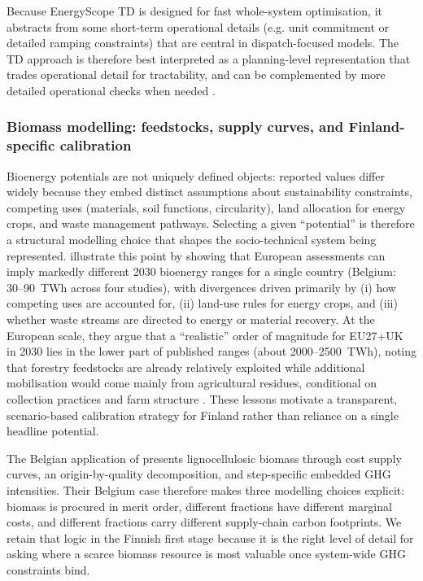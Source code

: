 \documentclass{article}
\begin{document}
Because EnergyScope TD is designed for fast whole-system optimisation, it abstracts from some short-term operational details (e.g. unit commitment or detailed ramping constraints) that are central in dispatch-focused models. The TD approach is therefore best interpreted as a planning-level representation that trades operational detail for tractability, and can be complemented by more detailed operational checks when needed \citep{thiranExploringOptionsFossilfree2025}.


\subsubsection{Biomass modelling: feedstocks, supply curves, and Finland-specific calibration}
\label{sec:biomass_modelling}

Bioenergy potentials are not uniquely defined objects: reported values differ widely because they embed distinct assumptions about sustainability constraints, competing uses (materials, soil functions, circularity), land allocation for energy crops, and waste management pathways. Selecting a given ``potential'' is therefore a structural modelling choice that shapes the socio-technical system being represented. \citet{collaNavigatingBioenergyHorizons2024} illustrate this point by showing that European assessments can imply markedly different 2030 bioenergy ranges for a single country (Belgium: 30--90~TWh across four studies), with divergences driven primarily by (i) how competing uses are accounted for, (ii) land-use rules for energy crops, and (iii) whether waste streams are directed to energy or material recovery. At the European scale, they argue that a ``realistic'' order of magnitude for EU27+UK in 2030 lies in the lower part of published ranges (about 2000--2500~TWh), noting that forestry feedstocks are already relatively exploited while additional mobilisation would come mainly from agricultural residues, conditional on collection practices and farm structure \citep{collaNavigatingBioenergyHorizons2024}. These lessons motivate a transparent, scenario-based calibration strategy for Finland rather than reliance on a single headline potential.

The Belgian application of \citet{collaOptimalUseLignocellulosic2022} presents lignocellulosic biomass through cost supply curves, an origin-by-quality decomposition, and step-specific embedded GHG intensities. Their Belgium case therefore makes three modelling choices explicit: biomass is procured in merit order, different fractions have different marginal costs, and different fractions carry different supply-chain carbon footprints. We retain that logic in the Finnish first stage because it is the right level of detail for asking where a scarce biomass resource is most valuable once system-wide GHG constraints bind.
\end{document}
